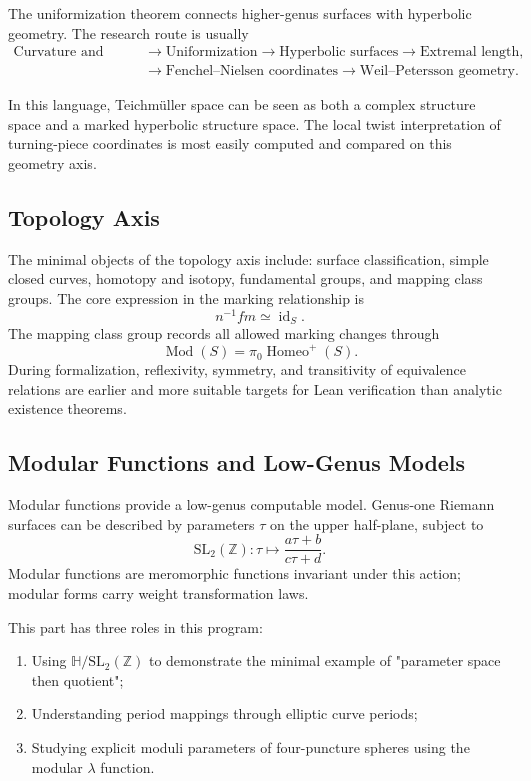 \documentclass[UTF8,a4paper,11pt]{article}
\begin{document}
The uniformization theorem connects higher-genus surfaces with hyperbolic geometry. The research route is usually
\[
\begin{aligned}
\text{Curvature and metric}
&\to \text{Uniformization}
\to \text{Hyperbolic surfaces}
\to \text{Extremal length},\\
&\to \text{Fenchel--Nielsen coordinates}
\to \text{Weil--Petersson geometry}.
\end{aligned}
\]

In this language, Teichmüller space can be seen as both a complex structure space and a marked hyperbolic structure space. The local twist interpretation of turning-piece coordinates is most easily computed and compared on this geometry axis.

\subsection{Topology Axis}

The minimal objects of the topology axis include: surface classification, simple closed curves, homotopy and isotopy, fundamental groups, and mapping class groups. The core expression in the marking relationship is
\[
  n^{-1}fm\simeq\operatorname{id}_S.
\]
The mapping class group records all allowed marking changes through
\[
  \operatorname{Mod}(S)=\pi_0\operatorname{Homeo}^+(S).
\]
During formalization, reflexivity, symmetry, and transitivity of equivalence relations are earlier and more suitable targets for Lean verification than analytic existence theorems.

\subsection{Modular Functions and Low-Genus Models}

Modular functions provide a low-genus computable model. Genus-one Riemann surfaces can be described by parameters $\tau$ on the upper half-plane, subject to
\[
  \mathrm{SL}_2(\mathbb Z):\tau\longmapsto\frac{a\tau+b}{c\tau+d}.
\]
Modular functions are meromorphic functions invariant under this action; modular forms carry weight transformation laws.

This part has three roles in this program:

\begin{enumerate}[label=(\arabic*)]
  \item Using $\mathbb H/\mathrm{SL}_2(\mathbb Z)$ to demonstrate the minimal example of "parameter space then quotient";
  \item Understanding period mappings through elliptic curve periods;
  \item Studying explicit moduli parameters of four-puncture spheres using the modular $\lambda$ function.
\end{enumerate}
\end{document}
